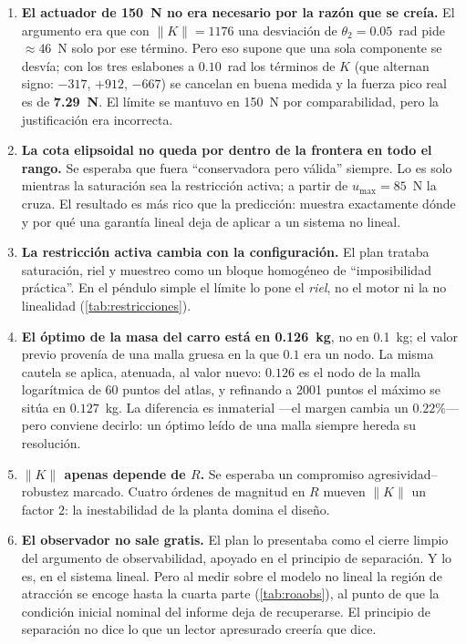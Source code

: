 \documentclass[11pt,letterpaper]{article}
\theoremstyle{definition}
\theoremstyle{plain}
\theoremstyle{remark}
\begin{document}
\begin{enumerate}
  \item \textbf{El actuador de 150~N no era necesario por la razón que se
  creía.} El argumento era que con $\|K\|=1176$ una desviación de
  $\theta_2=0.05$~rad pide $\approx46$~N solo por ese término. Pero eso supone
  que una sola componente se desvía; con los tres eslabones a $0.10$~rad los
  términos de $K$ (que alternan signo: $-317$, $+912$, $-667$) se cancelan en
  buena medida y la fuerza pico real es de \textbf{7.29~N}. El límite se mantuvo
  en 150~N por comparabilidad, pero la justificación era incorrecta.

  \item \textbf{La cota elipsoidal no queda por dentro de la frontera en todo el
  rango.} Se esperaba que fuera ``conservadora pero válida'' siempre. Lo es solo
  mientras la saturación sea la restricción activa; a partir de
  $u_{\max}=85$~N la cruza. El resultado es más rico que la predicción: muestra
  exactamente dónde y por qué una garantía lineal deja de aplicar a un sistema
  no lineal.

  \item \textbf{La restricción activa cambia con la configuración.} El plan
  trataba saturación, riel y muestreo como un bloque homogéneo de
  ``imposibilidad práctica''. En el péndulo simple el límite lo pone el
  \emph{riel}, no el motor ni la no linealidad (\cref{tab:restricciones}).

  \item \textbf{El óptimo de la masa del carro está en 0.126~kg}, no en 0.1~kg;
  el valor previo provenía de una malla gruesa en la que $0.1$ era un nodo. La
  misma cautela se aplica, atenuada, al valor nuevo: $0.126$ es el nodo de la
  malla logarítmica de 60 puntos del atlas, y refinando a 2001 puntos el máximo
  se sitúa en $0.127$~kg. La diferencia es inmaterial ---el margen cambia un
  $0.22\%$--- pero conviene decirlo: un óptimo leído de una malla siempre hereda
  su resolución.

  \item \textbf{$\|K\|$ apenas depende de $R$.} Se esperaba un compromiso
  agresividad--robustez marcado. Cuatro órdenes de magnitud en $R$ mueven
  $\|K\|$ un factor $2$: la inestabilidad de la planta domina el diseño.

  \item \textbf{El observador no sale gratis.} El plan lo presentaba como el
  cierre limpio del argumento de observabilidad, apoyado en el principio de
  separación. Y lo es, en el sistema lineal. Pero al medir sobre el modelo no
  lineal la región de atracción se encoge hasta la cuarta parte
  (\cref{tab:roaobs}), al punto de que la condición inicial nominal del informe
  deja de recuperarse. El principio de separación no dice lo que un lector
  apresurado creería que dice.
\end{enumerate}
\end{document}
